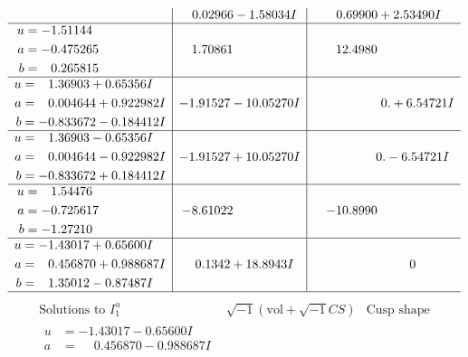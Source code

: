 \documentclass[1p]{elsarticle_modified}
\theoremstyle{definition}
\newcommand{\I}{\sqrt{-1}}
\begin{document}
$$\begin{array}{c|c|c}
 & \phantom{-}0.02966 - 1.58034 I & \phantom{-}0.69900 + 2.53490 I \\ \hline\begin{aligned}
u &= -1.51144\phantom{ +0.000000I} \\
a &= -0.475265\phantom{ +0.000000I} \\
b &= \phantom{-}0.265815\phantom{ +0.000000I}\end{aligned}
 & \phantom{-}1.70861\phantom{ +0.000000I} & \phantom{-}12.4980\phantom{ +0.000000I} \\ \hline\begin{aligned}
u &= \phantom{-}1.36903 + 0.65356 I \\
a &= \phantom{-}0.004644 + 0.922982 I \\
b &= -0.833672 - 0.184412 I\end{aligned}
 & -1.91527 - 10.05270 I & \phantom{-0.000000 -}0. + 6.54721 I \\ \hline\begin{aligned}
u &= \phantom{-}1.36903 - 0.65356 I \\
a &= \phantom{-}0.004644 - 0.922982 I \\
b &= -0.833672 + 0.184412 I\end{aligned}
 & -1.91527 + 10.05270 I & \phantom{-0.000000 } 0. - 6.54721 I \\ \hline\begin{aligned}
u &= \phantom{-}1.54476\phantom{ +0.000000I} \\
a &= -0.725617\phantom{ +0.000000I} \\
b &= -1.27210\phantom{ +0.000000I}\end{aligned}
 & -8.61022\phantom{ +0.000000I} & -10.8990\phantom{ +0.000000I} \\ \hline\begin{aligned}
u &= -1.43017 + 0.65600 I \\
a &= \phantom{-}0.456870 + 0.988687 I \\
b &= \phantom{-}1.35012 - 0.87487 I\end{aligned}
 & \phantom{-}0.1342 + 18.8943 I & \phantom{-0.000000 } 0\\
 \hline 
 \end{array}$$\newpage$$\begin{array}{c|c|c}  
\text{Solutions to }I^u_{1}& \I (\text{vol} + \sqrt{-1}CS) & \text{Cusp shape}\\
 \hline 
\begin{aligned}
u &= -1.43017 - 0.65600 I \\
a &= \phantom{-}0.456870 - 0.988687 I \\

\end{aligned}
\end{array}$$
\end{document}
